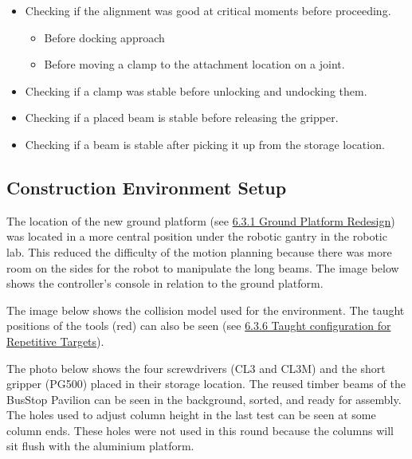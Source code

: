 \begin{itemize}
	\item Checking if the alignment was good at critical moments before proceeding.

\begin{itemize}
	\item Before docking approach

	\item Before moving a clamp to the attachment location on a joint.

\end{itemize}
	\item Checking if a clamp was stable before unlocking and undocking them.

	\item Checking if a placed beam is stable before releasing the gripper.

	\item Checking if a beam is stable after picking it up from the storage location.

\end{itemize}

\subsection{Construction Environment Setup}
\label{subsection:exploration_3_construction_environment_setup}

The location of the new ground platform (see \ul{6.3.1 Ground Platform Redesign}) was located in a more central position under the robotic gantry in the robotic lab. This reduced the difficulty of the motion planning because there was more room on the sides for the robot to manipulate the long beams. The image below shows the controller’s console in relation to the ground platform.




The image below shows the collision model used for the environment. The taught positions of the tools (red) can also be seen (see \ul{6.3.6 Taught configuration for Repetitive Targets}).




The photo below shows the four screwdrivers (CL3 and CL3M) and the short gripper (PG500) placed in their storage location. The reused timber beams of the BusStop Pavilion can be seen in the background, sorted, and ready for assembly. The holes used to adjust column height in the last test can be seen at some column ends. These holes were not used in this round because the columns will sit flush with the aluminium platform.

